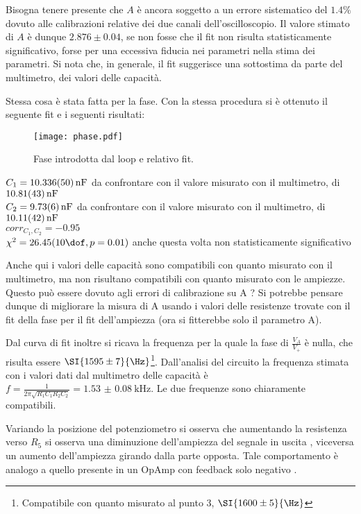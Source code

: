 Bisogna tenere presente che $A$ è ancora soggetto a un errore sistematico del $1.4 \%$ dovuto alle calibrazioni relative dei due canali dell'oscilloscopio. Il valore stimato di $A$ è dunque $2.876 \pm 0.04$, se non fosse che il fit non risulta statisticamente significativo, forse per una eccessiva fiducia nei parametri nella stima dei parametri.
Si nota che, in generale, il fit suggerisce una sottostima da parte del multimetro, dei  valori delle capacità.  


Stessa cosa è stata fatta per la fase. Con la stessa procedura si è ottenuto il seguente fit e i seguenti risultati:
\begin{figure}[h]
	\centering
	\texttt{[image: phase.pdf]}
	\caption{Fase introdotta dal loop e relativo fit.}
	\label{f:lpgn}
\end{figure}
$C_1=\SI{10.336 \pm 0.05}{nF}$ da confrontare con il valore misurato con il multimetro, di $\SI{10.81\pm 0.43}{nF}$\\
$C_2=\SI{9.73\pm 0.06}{nF}$ da confrontare con il valore misurato con il multimetro, di $\SI{10.11\pm 0.42}{nF}$\\
$corr_{C_1, C_2}=-0.95$\\
$\chi^2=26.45 (10 \dof, p = 0.01)$ anche questa volta non statisticamente significativo


Anche qui i valori delle capacità sono compatibili con quanto misurato con il multimetro, ma non risultano compatibili con quanto misurato con le ampiezze. Questo può essere dovuto agli errori di calibrazione su A ? Si potrebbe pensare dunque di migliorare la misura di A usando i valori delle resistenze trovate con il fit della fase per il fit dell'ampiezza (ora si fitterebbe solo il parametro A). %
 

Dal curva di fit inoltre si ricava la frequenza per la quale la fase di $\frac{V_A}{V_+}$ è nulla, che risulta essere $\SI{1595 \pm 7}{\Hz}$\footnote{Compatibile con quanto misurato al punto 3, $\SI{1600 \pm 5}{\Hz}$}.%
Dall'analisi del circuito la frequenza stimata con i valori dati dal multimetro delle capacità è $f=\frac{1}{2 \pi \sqrt{R_1C_1R_2C_2}}= \SI{1.53(8)}{\kHz}$. Le due frequenze sono chiaramente compatibili. 


Variando la posizione del potenziometro si osserva che aumentando la resistenza verso $R_5$ si osserva una diminuzione dell'ampiezza del segnale in uscita , viceversa un aumento dell'ampiezza girando dalla parte opposta. Tale comportamento è analogo a quello presente in un OpAmp con feedback solo negativo .
